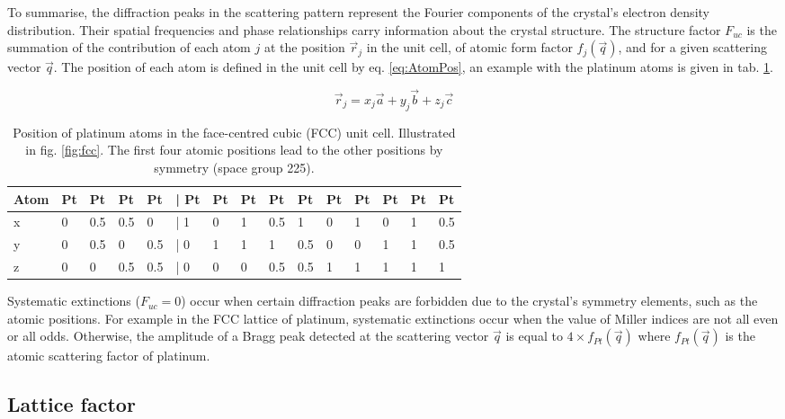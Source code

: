 To summarise, the diffraction peaks in the scattering pattern represent the Fourier components of the crystal's electron density distribution.
Their spatial frequencies and phase relationships carry information about the crystal structure.
The structure factor $F_{uc}$ is the summation of the contribution of each atom $j$ at the position $\vec{r}_j$ in the unit cell, of atomic form factor $f_j(\vec{q})$, and for a given scattering vector $\vec{q}$.
The position of each atom is defined in the unit cell by eq. \ref{eq:AtomPos}, an example with the platinum atoms is given in tab. \ref{tab:PtAtoms}.

\begin{equation}
    \label{eq:AtomPos}
    \vec{r}_j = x_j\vec{a} + y_j\vec{b} + z_j\vec{c}
\end{equation}

\begin{table}[!htb]
    \centering
    \begin{tabular}{@{}lllllllllllllll@{}}
    \toprule
    Atom & Pt & Pt  & Pt  & Pt  & | Pt & Pt & Pt & Pt  & Pt  & Pt & Pt & Pt & Pt & Pt  \\ \midrule
    x    & 0  & 0.5 & 0.5 & 0   & | 1  & 0  & 1  & 0.5 & 1   & 0  & 1  & 0  & 1  & 0.5 \\
    y    & 0  & 0.5 & 0   & 0.5 & | 0  & 1  & 1  & 1   & 0.5 & 0  & 0  & 1  & 1  & 0.5 \\
    z    & 0  & 0   & 0.5 & 0.5 & | 0  & 0  & 0  & 0.5 & 0.5 & 1  & 1  & 1  & 1  & 1   \\ \bottomrule
    \end{tabular}
    \caption{Position of platinum atoms in the face-centred cubic (FCC) unit cell. Illustrated in fig. \ref{fig:fcc}. The first four atomic positions  lead to the other positions by symmetry (space group 225).}
    \label{tab:PtAtoms}
\end{table}

Systematic extinctions ($F_{uc} = 0$) occur when certain diffraction peaks are forbidden due to the crystal's symmetry elements, such as the atomic positions.
For example in the FCC lattice of platinum, systematic extinctions occur when the value of Miller indices are not all even or all odds.
Otherwise, the amplitude of a Bragg peak detected at the scattering vector $\vec{q}$ is equal to $4\times f_{Pt}(\vec{q})$ where $f_{Pt}(\vec{q})$ is the atomic scattering factor of platinum.

\subsection{Lattice factor} \label{sec:LatticeFactor}

